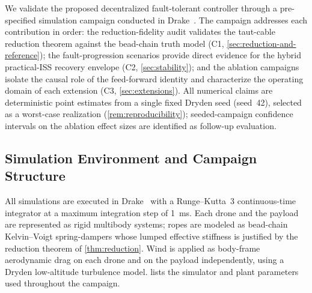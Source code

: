 We validate the proposed decentralized fault-tolerant controller through a pre-specified simulation campaign conducted in Drake~\cite {drake}. The campaign addresses each contribution in order: the reduction-fidelity audit validates the taut-cable reduction theorem against the bead-chain truth model (C1, \cref{sec:reduction-and-reference}); the fault-progression scenarios provide direct evidence for the hybrid practical-ISS recovery envelope (C2, \cref{sec:stability}); and the ablation campaigns isolate the causal role of the feed-forward identity and characterize the operating domain of each extension (C3, \cref{sec:extensions}). All numerical claims are deterministic point estimates from a single fixed Dryden seed (seed~42), selected as a worst-case realization (\cref{rem:reproducibility}); seeded-campaign confidence intervals on the ablation effect sizes are identified as follow-up evaluation.

\subsection{Simulation Environment and Campaign Structure}
\label{sec:campaign}


All simulations are executed in Drake~\cite{drake} with a Runge--Kutta~3 continuous-time integrator at a maximum integration step of \SI{1}{\milli\second}. Each drone and the payload are represented as rigid multibody systems; ropes are modeled as bead-chain Kelvin--Voigt spring-dampers whose lumped effective stiffness is justified by the reduction theorem of \cref{thm:reduction}. Wind is applied as body-frame aerodynamic drag on each drone and on the payload independently, using a Dryden low-altitude turbulence model.  lists the simulator and plant parameters used throughout the campaign.

